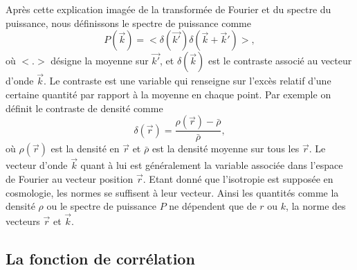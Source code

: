\documentclass[11pt, twoside, a4paper, openright]{report}
\begin{document}
Après cette explication imagée de la transformée de Fourier et du spectre du puissance, nous définissons le spectre de puissance comme
\begin{equation}
  \label{eq:def_pow_spec}
  P(\vec{k}) = < \delta(\vec{k'}) \delta(\vec{k}+\vec{k}') >,
\end{equation}
où $<.>$ désigne la moyenne sur $\vec{k'}$, et $\delta(\vec{k})$ est le contraste associé au vecteur d'onde $\vec{k}$. Le contraste est une variable qui renseigne sur l'excès relatif d'une certaine quantité par rapport à la moyenne en chaque point. Par exemple on définit le contraste de densité comme
\begin{equation}
  \label{eq:contraste}
  \delta(\vec{r}) = \frac{\rho(\vec{r}) - \bar \rho}{\bar \rho} ,
\end{equation}
où $\rho(\vec{r})$ est la densité en $\vec{r}$ et $\bar \rho$ est la densité moyenne sur tous les $\vec{r}$. Le vecteur d'onde $\vec{k}$ quant à lui est généralement la variable associée dans l'espace de Fourier au vecteur position $\vec{r}$. Etant donné que l'isotropie est supposée en cosmologie, les normes se suffisent à leur vecteur. Ainsi les quantités comme la densité $\rho$ ou le spectre de puissance $P$ ne dépendent que de $r$ ou $k$, la norme des vecteurs $\vec{r}$ et $\vec{k}$.


\subsection{La fonction de corrélation}

\end{document}
